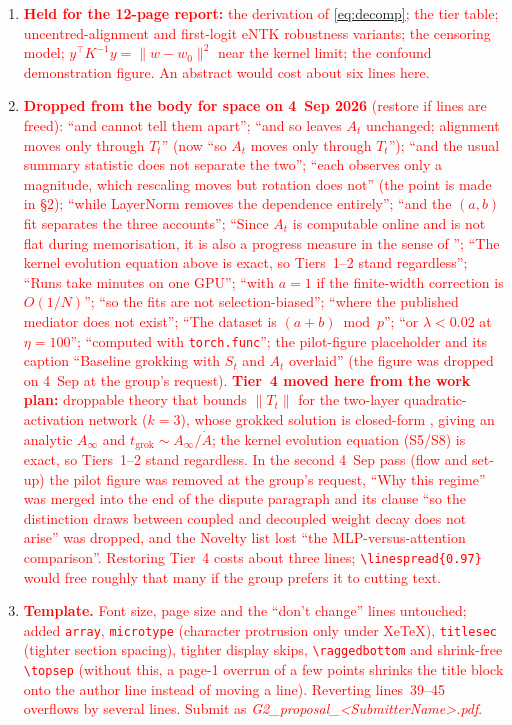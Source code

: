 \documentclass[a4paper,11pt]{article} %
\newcommand{\tgrok}{t_{\mathrm{grok}}}
\begin{document}
\begin{enumerate}[1.]
  \item \textcolor{red}{\textbf{Held for the 12-page report:} the derivation of \eqref{eq:decomp}; the tier table; uncentred-alignment and first-logit eNTK robustness variants; the censoring model; $y^\top K^{-1}y=\lVert w-w_0\rVert^2$ near the kernel limit; the confound demonstration figure. An abstract would cost about six lines here.}
  \item \textcolor{red}{\textbf{Dropped from the body for space on 4~Sep 2026} (restore if lines are freed): ``and cannot tell them apart''; ``and so leaves $A_t$ unchanged; alignment moves only through $T_t$'' (now ``so $A_t$ moves only through $T_t$''); ``and the usual summary statistic does not separate the two''; ``each observes only a magnitude, which rescaling moves but rotation does not'' (the point is made in \S2); ``while LayerNorm removes the dependence entirely''; ``and the $(a,b)$ fit separates the three accounts''; ``Since $A_t$ is computable online and is not flat during memorisation, it is also a progress measure in the sense of \citet{nanda2023progress}''; ``The kernel evolution equation above is exact, so Tiers~1--2 stand regardless''; ``Runs take minutes on one GPU''; ``with $a=1$ if the finite-width correction is $O(1/N)$''; ``so the fits are not selection-biased''; ``where the published mediator does not exist''; ``The dataset is $(a+b)\bmod p$''; ``or $\lambda<0.02$ at $\eta=100$''; ``computed with \texttt{torch.func}''; the pilot-figure placeholder and its caption ``Baseline grokking with $S_t$ and $A_t$ overlaid'' (the figure was dropped on 4~Sep at the group's request). \textbf{Tier~4 moved here from the work plan:} droppable theory that bounds $\lVert T_t\rVert$ for the two-layer quadratic-activation network ($k=3$), whose grokked solution is closed-form \citep{gromov2023grokking}, giving an analytic $A_\infty$ and $\tgrok\sim A_\infty/\dot A$; the kernel evolution equation (S5/S8) is exact, so Tiers~1--2 stand regardless. In the second 4~Sep pass (flow and set-up) the pilot figure was removed at the group's request, ``Why this regime'' was merged into the end of the dispute paragraph and its clause ``so the distinction \citeauthor{kim2026clock} draws between coupled and decoupled weight decay does not arise'' was dropped, and the Novelty list lost ``the MLP-versus-attention comparison''. Restoring Tier~4 costs about three lines; \texttt{\textbackslash linespread\{0.97\}} would free roughly that many if the group prefers it to cutting text.}
  \item \textcolor{red}{\textbf{Template.} Font size, page size and the ``don't change'' lines untouched; added \texttt{array}, \texttt{microtype} (character protrusion only under XeTeX), \texttt{titlesec} (tighter section spacing), tighter display skips, \texttt{\textbackslash raggedbottom} and shrink-free \texttt{\textbackslash topsep} (without this, a page-1 overrun of a few points shrinks the title block onto the author line instead of moving a line). Reverting lines~39--45 overflows by several lines. Submit as \emph{G2\_proposal\_\textless SubmitterName\textgreater.pdf}.}
\end{enumerate}
\end{document}
